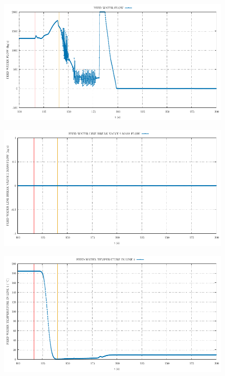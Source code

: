 \documentclass{article}
\begin{document}
\begin{multicols}{2}
\begin{figure}[H]
\end{figure}
\begin{figure}[H]
\centering
\includegraphics[width=\linewidth]{./graphs/FEED WATER FLOW_comp.pdf}
\end{figure}
\begin{figure}[H]
\centering
\includegraphics[width=\linewidth]{./graphs/FEED WATER LINE BREAK VALVE 2 MASS FLOW_comp.pdf}
\end{figure}
\begin{figure}[H]
\centering
\includegraphics[width=\linewidth]{./graphs/FEED WATER TEMPERATURE IN LINE 1_comp.pdf}

\end{figure}
\end{multicols}
\end{document}
